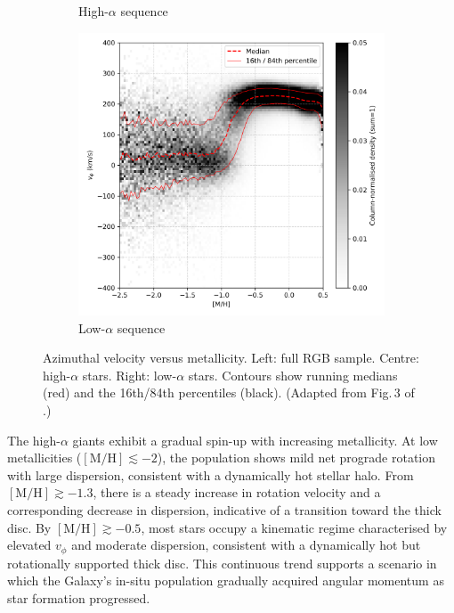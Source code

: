 \documentclass[a4paper,12pt]{article}
\begin{document}
\begin{figure}[H]
\begin{subfigure}[b]{0.32\textwidth}
    \caption{High-$\alpha$ sequence}
  \end{subfigure}\hfill
  \begin{subfigure}[b]{0.32\textwidth}
    \includegraphics[width=\textwidth]{../figures/vis_mh_vphi_low_alpha.png}
    \caption{Low-$\alpha$ sequence}
  \end{subfigure}

  \caption{Azimuthal velocity versus metallicity.  
           Left: full RGB sample.  
           Centre: high-$\alpha$ stars.  
           Right: low-$\alpha$ stars.  
           Contours show running medians (red) and the 16th/84th percentiles (black).  
           (Adapted from Fig.\,3 of \citealt{Vis2024}.)}
  \label{fig:mh_vphi_alpha}
\end{figure}

The high-$\alpha$ giants 
exhibit a gradual spin-up with increasing metallicity.  
At low metallicities ($[\mathrm{M/H}]\lesssim -2$), the population 
shows mild net prograde rotation with large dispersion, 
consistent with a dynamically hot stellar halo. From $[\mathrm{M/H}]\gtrsim -1.3$, 
there is a steady increase in rotation velocity and a corresponding decrease in 
dispersion, indicative of a transition toward the thick disc.  
By $[\mathrm{M/H}]\gtrsim -0.5$, most stars occupy a kinematic regime characterised 
by elevated $v_\phi$ and moderate dispersion, consistent with a dynamically hot 
but rotationally supported thick disc. This continuous trend supports 
a scenario in which the Galaxy’s in-situ population gradually acquired angular 
momentum as star formation progressed.
\end{document}
